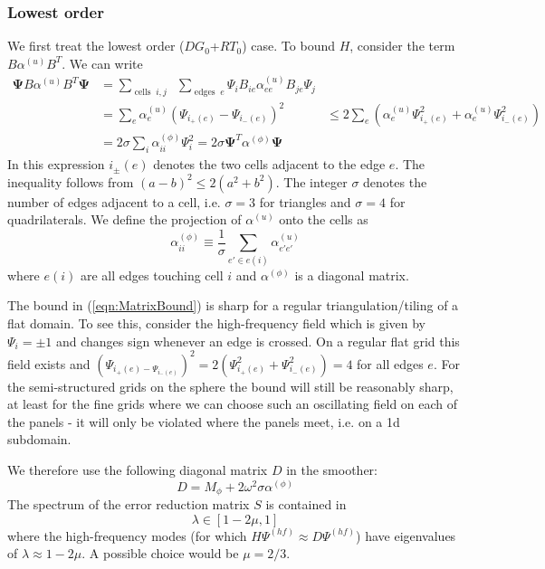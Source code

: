 \documentclass[12pt]{article}
\renewcommand{\vec}[1]{\boldsymbol{#1}}
\begin{document}
\subsubsection{Lowest order}
We first treat the lowest order ($DG_0$+$RT_0$) case.
To bound $H$, consider the term $B\alpha^{(u)} B^T$. We can write
\begin{equation}
 \begin{aligned}
  \vec{\Psi} B \alpha^{(u)} B^T \vec{\Psi} &= \sum_{\operatorname{cells}\;i,j}\;\;\sum_{\operatorname{edges}\;e} \Psi_i B_{ie} \alpha^{(u)}_{ee} B_{je} \Psi_j 
\\
  &= \sum_{e} \alpha_e^{(u)} \left(\Psi_{i_+(e)}-\Psi_{i_-(e)}\right)^2
  & \le 2\sum_e\left(\alpha_e^{(u)} \Psi_{i_+(e)}^2+\alpha_e^{(u)} \Psi_{i_-(e)}^2\right)\\
  &= 2 \sigma \sum_i \alpha_{ii}^{(\phi)} \Psi_i ^2 = 2\sigma \vec{\Psi}^T \alpha^{(\phi)}\vec{\Psi}
 \end{aligned}\label{eqn:MatrixBound}
\end{equation}
In this expression $i_{\pm}(e)$ denotes the two cells adjacent to the edge $e$. The inequality follows from $(a-b)^2 \le 2(a^2+b^2)$. The integer $\sigma$ denotes the number of edges adjacent to a cell, i.e. $\sigma=3$ for triangles and $\sigma=4$ for quadrilaterals. We define the projection of $\alpha^{(u)}$ onto the  cells as 
\begin{equation}
  \alpha^{(\phi)}_{ii} \equiv \frac{1}{\sigma} \sum_{e'\in e(i)} \alpha_{e'e'}^{(u)}
\end{equation}
where $e(i)$ are all edges touching cell $i$ and $\alpha^{(\phi)}$ is a diagonal matrix.

The bound in (\ref{eqn:MatrixBound}) is sharp for a regular triangulation/tiling of a flat domain. To see this, consider the high-frequency field which is given by $\Psi_i = \pm 1$ and changes sign whenever an edge is crossed. On a regular flat grid this field exists and $(\Psi_{i_+(e)-\Psi_{i_-(e)}})^2 = 2 (\Psi_{i_+(e)}^2+\Psi_{i_-(e)}^2) = 4$ for all edges $e$. For the semi-structured grids on the sphere the bound will still be reasonably sharp, at least for the fine grids where we can choose such an oscillating field on each of the panels - it will only be violated where the panels meet, i.e. on a 1d subdomain.

We therefore use the following diagonal matrix $D$ in the smoother:
\begin{equation}
  D = M_{\phi} + 2\omega^2 \sigma \alpha^{(\phi)}
\label{eqn:blockSmootherLO}
\end{equation}
The spectrum of the error reduction matrix $S$ is contained in
\begin{equation}
  \lambda \in [1-2\mu,1]
\end{equation}
where the high-frequency modes (for which $H\Psi^{(hf)}\approx D\Psi^{(hf)}$) have eigenvalues of $\lambda \approx 1-2\mu$. A possible choice would be $\mu=2/3$.
\end{document}
